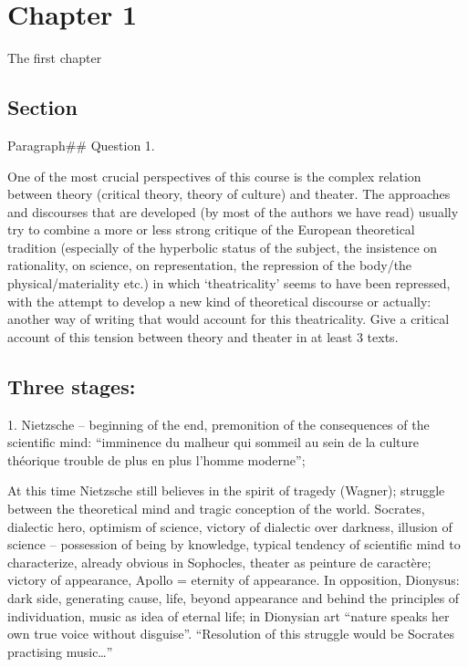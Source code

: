 \documentclass[oneside]{memoir}
\let\oldsection\section
\renewcommand\section{\clearpage\gdef\znewpage{\global\let\znewpage\clearpage}\oldsection}
\begin{document}
\chapter{Chapter 1}\label{chapter-1}

The first chapter

\section{Section}\label{section}

Paragraph\#\# Question 1.

One of the most crucial perspectives of this course is the complex
relation between theory (critical theory, theory of culture) and
theater. The approaches and discourses that are developed (by most of
the authors we have read) usually try to combine a more or less strong
critique of the European theoretical tradition (especially of the
hyperbolic status of the subject, the insistence on rationality, on
science, on representation, the repression of the body/the
physical/materiality etc.) in which `theatricality' seems to have been
repressed, with the attempt to develop a new kind of theoretical
discourse or actually: another way of writing that would account for
this theatricality. Give a critical account of this tension between
theory and theater in at least 3 texts.

\section{Three stages:}\label{three-stages}

1. Nietzsche -- beginning of the end, premonition of the consequences of
the scientific mind: ``imminence du malheur qui sommeil au sein de la
culture théorique trouble de plus en plus l'homme moderne'';

At this time Nietzsche still believes in the spirit of tragedy (Wagner);
struggle between the theoretical mind and tragic conception of the
world. Socrates, dialectic hero, optimism of science, victory of
dialectic over darkness, illusion of science -- possession of being by
knowledge, typical tendency of scientific mind to characterize, already
obvious in Sophocles, theater as peinture de caractère; victory of
appearance, Apollo = eternity of appearance. In opposition, Dionysus:
dark side, generating cause, life, beyond appearance and behind the
principles of individuation, music as idea of eternal life; in Dionysian
art ``nature speaks her own true voice without disguise''. ``Resolution
of this struggle would be Socrates practising music\ldots{}''
\end{document}
